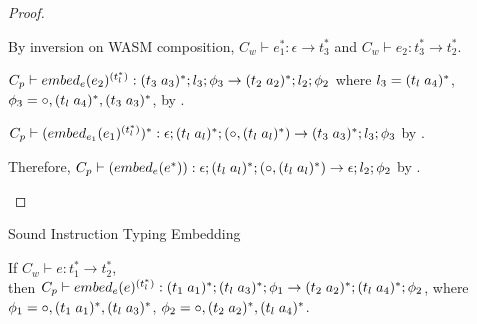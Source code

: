 \begin{proof}
\begin{enumerate}
        By inversion on WASM composition, $C_w \vdash e_1^{*} : \epsilon \rightarrow t_3^{*}$ and $C_w \vdash e_2 : t_3^{*} \rightarrow t_2^{*}$.

        $C_p \vdash \embed[e]{e_2}^{(t_l^{*})} : \ti{t_3}{a_3}^{*};l_3;\phi_3 \rightarrow \ti{t_2}{a_2}^{*};l_2;\phi_2$
        where $l_3 = \ti{t_l}{a_4}^{*}$, $\phi_3 = \circ,\ti{t_l}{a_4}^{*},\ti{t_3}{a_3}^{*}$, by .

        $C_p \vdash (\embed[e_1]{e_1}^{(t_l^{*})})^{*} : \epsilon;\ti{t_l}{a_l}^{*};(\circ,\ti{t_l}{a_l}^{*}) \rightarrow \ti{t_3}{a_3}^{*};l_3;\phi_3$ by .

        Therefore, $C_p \vdash (\embed[e]{e^{*}}) : \epsilon;\ti{t_l}{a_l}^{*};(\circ,\ti{t_l}{a_l}^{*}) \rightarrow \epsilon;l_2;\phi_2$ by .

    \end{enumerate}

\end{proof}

\begin{lemma}{Sound Instruction Typing Embedding}

    If $C_w \vdash e : t_1^{*} \rightarrow t_2^{*}$,
    \\ then $C_p \vdash \embed[e]{e}^{(t_l^{*})} : \ti{t_1}{a_1}^{*};\ti{t_l}{a_3}^{*};\phi_1 \rightarrow \ti{t_2}{a_2}^{*};\ti{t_l}{a_4}^{*};\phi_2$, where
    $\phi_1 = \circ,\ti{t_1}{a_1}^{*},\ti{t_l}{a_3}^{*}$,
    $\phi_2 = \circ,\ti{t_2}{a_2}^{*},\ti{t_l}{a_4}^{*}$.
\end{lemma}

